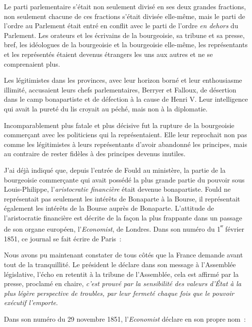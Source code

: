 \documentclass[french,twoside]{book} %
\newenvironment{quoteblock}%
  {\begin{quoting}}
  {\end{quoting}}
\newenvironment{quotebar}{%
    \def\FrameCommand{{\color{rubric!10!}\vrule width 0.5em} \hspace{0.9em}}%
    \def\OuterFrameSep{\itemsep} %
    \MakeFramed {\advance\hsize-\width \FrameRestore}
  }%
  {%
    \endMakeFramed
  }
\renewenvironment{quoteblock}%
  {%
    \savenotes
    \setstretch{0.9}
    \normalfont
    \begin{quotebar}
  }
  {%
    \end{quotebar}
    \spewnotes
  }
\begin{document}
Le parti parlementaire s’était non seulement divisé en ses deux grandes fractions, non seulement chacune de ces fractions s’était divisée elle-même, mais le parti de l’ordre au Parlement était entré en conflit avec le parti de l’ordre \emph{en dehors} du Parlement. Les orateurs et les écrivains de la bourgeoisie, sa tribune et sa presse, bref, les idéologues de la bourgeoisie et la bourgeoisie elle-même, les représentants et les représentés étaient devenus étrangers les uns aux autres et ne se comprenaient plus.\par
Les légitimistes dans les provinces, avec leur horizon borné et leur enthousiasme illimité, accusaient leurs chefs parlementaires, Berryer et Falloux, de désertion dans le camp bonapartiste et de défection à la cause de Henri V. Leur intelligence qui avait la pureté du lis croyait au péché, mais non à la diplomatie.\par
Incomparablement plus fatale et plus décisive fut la rupture de la bourgeoisie commerçant avec les politiciens qui la représentaient. Elle leur reprochait non pas comme les légitimistes à leurs représentants d’avoir abandonné les principes, mais au contraire de rester fidèles à des principes devenus inutiles.\par
J’ai déjà indiqué que, depuis l’entrée de Fould au ministère, la partie de la bourgeoisie commerçante qui avait possédé la plus grande partie du pouvoir sous Louis-Philippe, l’\emph{aristocratie financière} était devenue bonapartiste. Fould ne représentait pas seulement les intérêts de Bonaparte à la Bourse, il représentait également les intérêts de la Bourse auprès de Bonaparte. L’attitude de l’aristocratie financière est décrite de la façon la plus frappante dans un passage de son organe européen, l’\emph{Economist}, de Londres. Dans son numéro du 1\textsuperscript{ᵉʳ} février 1851, ce journal se fait écrire de Paris :\par

\begin{quoteblock}
 \noindent Nous avons pu maintenant constater de tous côtés que la France demande avant tout de la tranquillité. Le président le déclare dans son message à l’Assemblée législative, l’écho en retentit à la tribune de l’Assemblée, cela est affirmé par la presse, proclamé en chaire, \emph{c’est prouvé par la sensibilité des valeurs d’État à la plus légère perspective de troubles, par leur fermeté chaque fois que le pouvoir exécutif l’emporte}.
\end{quoteblock}

\noindent Dans son numéro du 29 novembre 1851, l’\emph{Economist} déclare en son propre nom :\par
\end{document}
